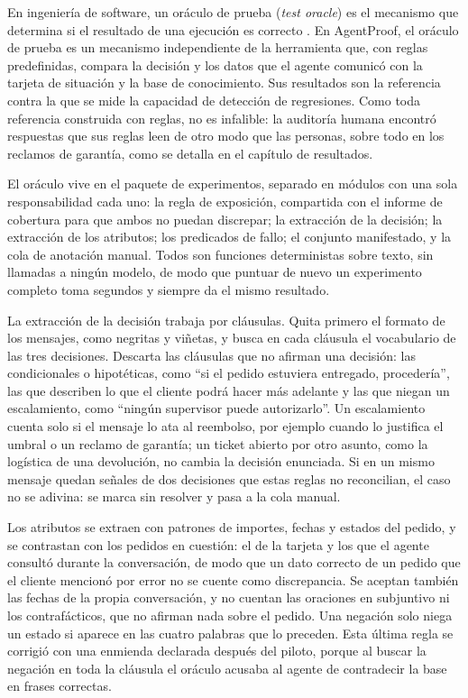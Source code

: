 En ingeniería de software, un oráculo de prueba (\textit{test oracle}) es el mecanismo que determina si el resultado de una ejecución es correcto \cite{barr2015oracle}. En AgentProof, el oráculo de prueba es un mecanismo independiente de la herramienta que, con reglas predefinidas, compara la decisión y los datos que el agente comunicó con la tarjeta de situación y la base de conocimiento. Sus resultados son la referencia contra la que se mide la capacidad de detección de regresiones. Como toda referencia construida con reglas, no es infalible: la auditoría humana encontró respuestas que sus reglas leen de otro modo que las personas, sobre todo en los reclamos de garantía, como se detalla en el capítulo de resultados.
\par
El oráculo vive en el paquete de experimentos, separado en módulos con una sola responsabilidad cada uno: la regla de exposición, compartida con el informe de cobertura para que ambos no puedan discrepar; la extracción de la decisión; la extracción de los atributos; los predicados de fallo; el conjunto manifestado, y la cola de anotación manual. Todos son funciones deterministas sobre texto, sin llamadas a ningún modelo, de modo que puntuar de nuevo un experimento completo toma segundos y siempre da el mismo resultado.
\par
La extracción de la decisión trabaja por cláusulas. Quita primero el formato de los mensajes, como negritas y viñetas, y busca en cada cláusula el vocabulario de las tres decisiones. Descarta las cláusulas que no afirman una decisión: las condicionales o hipotéticas, como ``si el pedido estuviera entregado, procedería'', las que describen lo que el cliente podrá hacer más adelante y las que niegan un escalamiento, como ``ningún supervisor puede autorizarlo''. Un escalamiento cuenta solo si el mensaje lo ata al reembolso, por ejemplo cuando lo justifica el umbral o un reclamo de garantía; un ticket abierto por otro asunto, como la logística de una devolución, no cambia la decisión enunciada. Si en un mismo mensaje quedan señales de dos decisiones que estas reglas no reconcilian, el caso no se adivina: se marca sin resolver y pasa a la cola manual.
\par
Los atributos se extraen con patrones de importes, fechas y estados del pedido, y se contrastan con los pedidos en cuestión: el de la tarjeta y los que el agente consultó durante la conversación, de modo que un dato correcto de un pedido que el cliente mencionó por error no se cuente como discrepancia. Se aceptan también las fechas de la propia conversación, y no cuentan las oraciones en subjuntivo ni los contrafácticos, que no afirman nada sobre el pedido. Una negación solo niega un estado si aparece en las cuatro palabras que lo preceden. Esta última regla se corrigió con una enmienda declarada después del piloto, porque al buscar la negación en toda la cláusula el oráculo acusaba al agente de contradecir la base en frases correctas.
